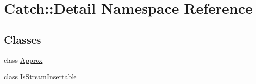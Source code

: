 \hypertarget{namespace_catch_1_1_detail}{}\section{Catch\+:\+:Detail Namespace Reference}
\label{namespace_catch_1_1_detail}
\subsection*{Classes}
\begin{DoxyCompactItemize}
\item 
class \mbox{\hyperlink{class_catch_1_1_detail_1_1_approx}{Approx}}
\item 
class \mbox{\hyperlink{class_catch_1_1_detail_1_1_is_stream_insertable}{Is\+Stream\+Insertable}}
\end{DoxyCompactItemize}
